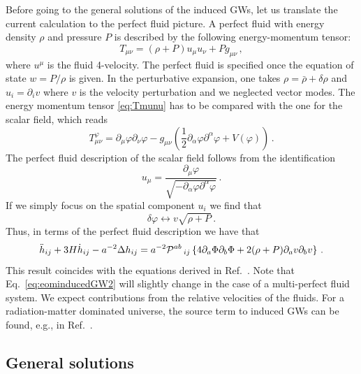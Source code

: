 \documentclass[a4paper,11pt]{article}
\numberwithin{equation}{section}
\begin{document}
Before going to the general solutions of the induced GWs, let us translate the current calculation to the perfect fluid picture. A perfect fluid with energy density $\rho$ and pressure $P$ is described by the following energy-momentum tensor:
\begin{equation}\label{eq:Tmunu}
T_{\mu\nu}=\left(\rho+P\right)u_\mu u_\nu+P g_{\mu\nu}\,,
\end{equation}
where $u^\mu$ is the fluid 4-velocity. The perfect fluid is specified once the equation of state $w=P/\rho$ is given. In the perturbative expansion, one takes $\rho=\bar\rho+\delta\rho$ and $u_i=\partial_i v$ where $v$ is the velocity perturbation and we neglected vector modes. The energy momentum tensor \eqref{eq:Tmunu} has to be compared with the one for the scalar field, which reads
\begin{equation}\label{eq:Tmunuphi}
T^\varphi_{\mu\nu}=\partial_\mu\varphi\partial_\nu\varphi-g_{\mu\nu}\left(\frac{1}{2}\partial_\alpha\varphi\partial^\alpha\varphi+V(\varphi)\right)\,.
\end{equation}
The perfect fluid description of the scalar field follows from the identification
\begin{equation}
u_\mu=\frac{\partial_\mu \varphi}{\sqrt{-\partial_\alpha\varphi\partial^\alpha\varphi}}\,.
\end{equation}
If we simply focus on the spatial component $u_i$ we find that
\begin{equation}
\delta\varphi\leftrightarrow v\sqrt{\rho+P}\,.
\end{equation}
Thus, in terms of the perfect fluid description we have that
\begin{equation}\label{eq:eominducedGW2}
\ddot h_{ij}+3H\dot h_{ij}-a^{-2}\Delta h_{ij}=a^{-2}{\cal P}^{ab}\,_{ij}\left\{4\partial_a \Phi \partial_b \Phi+2(\rho+P)\partial_a v \partial_b v\right\}\,.
\end{equation}
This result coincides with the equations derived in Ref.~\cite{Ananda:2006af,Baumann:2007zm}. Note that Eq.~\eqref{eq:eominducedGW2} will slightly change in the case of a multi-perfect fluid system. We expect contributions from the relative velocities of the fluids. For a radiation-matter dominated universe, the source term to induced GWs can be found, e.g., in Ref.~\cite{Domenech:2020ssp}.

\subsection{General solutions \label{eq:generalsolutions}}
\end{document}
